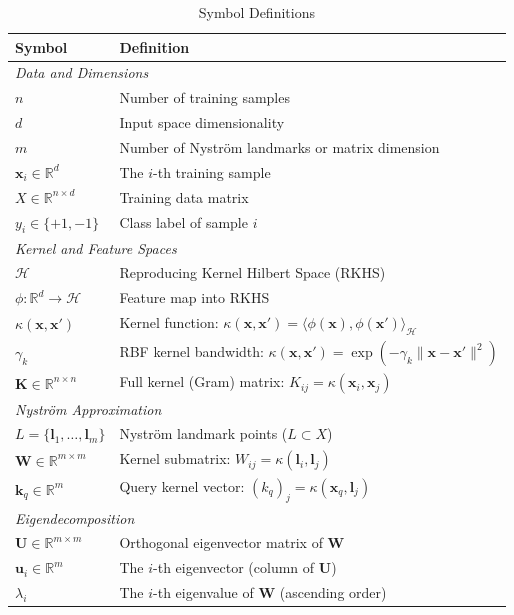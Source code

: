 \documentclass[journal]{IEEEtran}
\begin{document}
\begin{table}[!t]
\centering
\caption{Symbol Definitions}
\label{tab:notation}
\small
\renewcommand{\arraystretch}{1.2}
\begin{tabular}{@{}p{1.4cm}p{6.2cm}@{}}
\toprule
\textbf{Symbol} & \textbf{Definition} \\
\midrule
\multicolumn{2}{l}{\textit{Data and Dimensions}} \\
$n$ & Number of training samples \\
$d$ & Input space dimensionality \\
$m$ & Number of Nystr\"{o}m landmarks or matrix dimension \\
$\bm{x}_i \in \mathbb{R}^d$ & The $i$-th training sample \\
$X \in \mathbb{R}^{n \times d}$ & Training data matrix \\
$y_i \in \{+1, -1\}$ & Class label of sample $i$ \\
\midrule
\multicolumn{2}{l}{\textit{Kernel and Feature Spaces}} \\
$\mathcal{H}$ & Reproducing Kernel Hilbert Space (RKHS) \\
$\phi: \mathbb{R}^d \to \mathcal{H}$ & Feature map into RKHS \\
$\kappa(\bm{x}, \bm{x}')$ & Kernel function: $\kappa(\bm{x}, \bm{x}') = \langle \phi(\bm{x}), \phi(\bm{x}') \rangle_\mathcal{H}$ \\
$\gamma_k$ & RBF kernel bandwidth: $\kappa(\bm{x}, \bm{x}') = \exp(-\gamma_k \|\bm{x} - \bm{x}'\|^2)$ \\
$\bm{K} \in \mathbb{R}^{n \times n}$ & Full kernel (Gram) matrix: $K_{ij} = \kappa(\bm{x}_i, \bm{x}_j)$ \\
\midrule
\multicolumn{2}{l}{\textit{Nystr\"{o}m Approximation}} \\
$L = \{\bm{l}_1, \ldots, \bm{l}_m\}$ & Nystr\"{o}m landmark points ($L \subset X$) \\
$\bm{W} \in \mathbb{R}^{m \times m}$ & Kernel submatrix: $W_{ij} = \kappa(\bm{l}_i, \bm{l}_j)$ \\
$\bm{k}_q \in \mathbb{R}^m$ & Query kernel vector: $(k_q)_j = \kappa(\bm{x}_q, \bm{l}_j)$ \\
\midrule
\multicolumn{2}{l}{\textit{Eigendecomposition}} \\
$\bm{U} \in \mathbb{R}^{m \times m}$ & Orthogonal eigenvector matrix of $\bm{W}$ \\
$\bm{u}_i \in \mathbb{R}^m$ & The $i$-th eigenvector (column of $\bm{U}$) \\
$\lambda_i$ & The $i$-th eigenvalue of $\bm{W}$ (ascending order) \\

\end{tabular}
\end{table}
\end{document}
